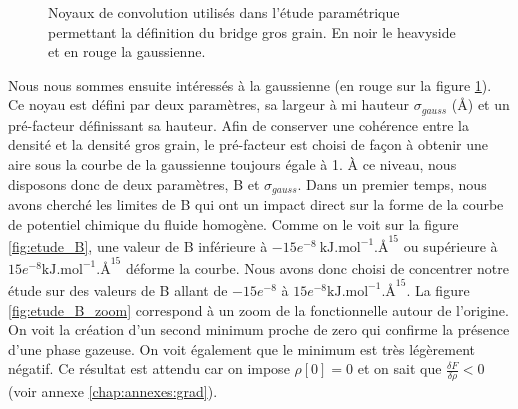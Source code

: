
\begin{figure}[h]
    \center    
    \caption[Noyaux de convolution utilisés dans l'étude paramétrique permettant la définition du bridge gros grain.]{Noyaux de convolution utilisés dans l'étude paramétrique permettant la définition du bridge gros grain. En noir le heavyside et en rouge la gaussienne.}
    \label{fig:noyaux}
\end{figure}



Nous nous sommes ensuite intéressés à la gaussienne (en rouge sur la figure \ref{fig:noyaux}).
Ce noyau est défini par deux paramètres, sa largeur à mi hauteur $\sigma_{gauss}$ (\AA) et un pré-facteur définissant sa hauteur.
Afin de conserver une cohérence entre la densité et la densité gros grain, le pré-facteur est choisi de façon à obtenir une aire sous la courbe de la gaussienne toujours égale à 1.
\`A ce niveau, nous disposons donc de deux paramètres, B et $\sigma_{gauss}$.
Dans un premier temps, nous avons cherché les limites de B qui ont un impact direct sur la forme de la courbe de potentiel chimique du fluide homogène.
Comme on le voit sur la figure \ref{fig:etude_B}, une valeur de B inférieure à $-15e^{-8}\  \mathrm{kJ.mol}^{-1}.\text{\AA}^{15}$ ou supérieure à $15e^{-8} \mathrm{kJ.mol}^{-1}.\text{\AA}^{15}$ déforme la courbe.
Nous avons donc choisi de concentrer notre étude sur des valeurs de B allant de $-15e^{-8}$ à $15e^{-8} \mathrm{kJ.mol}^{-1}.\text{\AA}^{15}$.
La figure \ref{fig:etude_B_zoom} correspond à un zoom de la fonctionnelle autour de l'origine. On voit la création d'un second minimum proche de zero qui confirme la présence d'une phase gazeuse. On voit également que le minimum est très légèrement négatif. Ce résultat est attendu car on impose $\rho[0]=0$ et on sait que $\frac{\delta F}{\delta \rho}<0$ (voir annexe \ref{chap:annexes:grad}).

